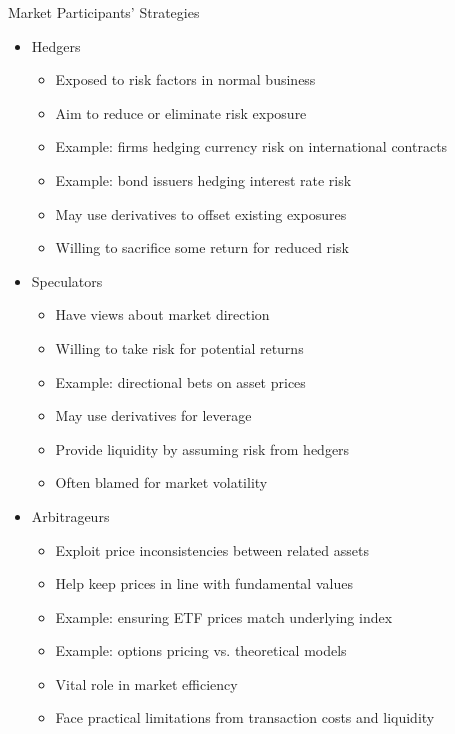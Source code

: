 \documentclass[10pt,handout]{beamer}
\begin{document}
\begin{frame}{Market Participants' Strategies}
  \begin{itemize}[<+->]
    \item Hedgers
      \begin{itemize}
        \item Exposed to risk factors in normal business
        \item Aim to reduce or eliminate risk exposure
        \item Example: firms hedging currency risk on international contracts
        \item Example: bond issuers hedging interest rate risk
        \item May use derivatives to offset existing exposures
        \item Willing to sacrifice some return for reduced risk
      \end{itemize}
    \item Speculators
      \begin{itemize}
        \item Have views about market direction
        \item Willing to take risk for potential returns
        \item Example: directional bets on asset prices
        \item May use derivatives for leverage
        \item Provide liquidity by assuming risk from hedgers
        \item Often blamed for market volatility
      \end{itemize}
    \item Arbitrageurs
      \begin{itemize}
        \item Exploit price inconsistencies between related assets
        \item Help keep prices in line with fundamental values
        \item Example: ensuring ETF prices match underlying index
        \item Example: options pricing vs. theoretical models
        \item Vital role in market efficiency
        \item Face practical limitations from transaction costs and liquidity
      \end{itemize}
  \end{itemize}
\end{frame}
\end{document}
